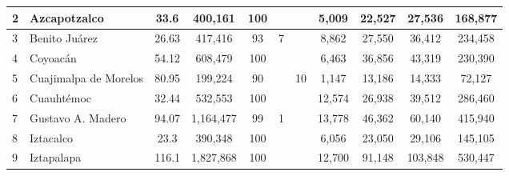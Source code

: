 \begin{landscape}
\begin{table}[]
{\begin{tabular}{llcccllcccc}
\multicolumn{1}{|l|}{2} & \multicolumn{1}{l|}{Azcapotzalco} & \multicolumn{1}{c|}{33.6} & \multicolumn{1}{c|}{400,161} & \multicolumn{1}{c|}{100} & \multicolumn{1}{l|}{} & \multicolumn{1}{c|}{} & \multicolumn{1}{c|}{5,009} & \multicolumn{1}{c|}{22,527} & \multicolumn{1}{c|}{27,536} & \multicolumn{1}{c|}{168,877} \\ \hline
\multicolumn{1}{|l|}{3} & \multicolumn{1}{l|}{Benito Juárez} & \multicolumn{1}{c|}{26.63} & \multicolumn{1}{c|}{417,416} & \multicolumn{1}{c|}{93} & \multicolumn{1}{c|}{7} & \multicolumn{1}{l|}{} & \multicolumn{1}{c|}{8,862} & \multicolumn{1}{c|}{27,550} & \multicolumn{1}{c|}{36,412} & \multicolumn{1}{c|}{234,458} \\ \hline
\multicolumn{1}{|l|}{4} & \multicolumn{1}{l|}{Coyoacán} & \multicolumn{1}{c|}{54.12} & \multicolumn{1}{c|}{608,479} & \multicolumn{1}{c|}{100} & \multicolumn{1}{l|}{} & \multicolumn{1}{l|}{} & \multicolumn{1}{c|}{6,463} & \multicolumn{1}{c|}{36,856} & \multicolumn{1}{c|}{43,319} & \multicolumn{1}{c|}{230,390} \\ \hline
\multicolumn{1}{|l|}{5} & \multicolumn{1}{l|}{Cuajimalpa de Morelos} & \multicolumn{1}{c|}{80.95} & \multicolumn{1}{c|}{199,224} & \multicolumn{1}{c|}{90} & \multicolumn{1}{l|}{} & \multicolumn{1}{c|}{10} & \multicolumn{1}{c|}{1,147} & \multicolumn{1}{c|}{13,186} & \multicolumn{1}{c|}{14,333} & \multicolumn{1}{c|}{72,127} \\ \hline
\multicolumn{1}{|l|}{6} & \multicolumn{1}{l|}{Cuauhtémoc} & \multicolumn{1}{c|}{32.44} & \multicolumn{1}{c|}{532,553} & \multicolumn{1}{c|}{100} & \multicolumn{1}{l|}{} & \multicolumn{1}{l|}{} & \multicolumn{1}{c|}{12,574} & \multicolumn{1}{c|}{26,938} & \multicolumn{1}{c|}{39,512} & \multicolumn{1}{c|}{286,460} \\ \hline
\multicolumn{1}{|l|}{7} & \multicolumn{1}{l|}{Gustavo A. Madero} & \multicolumn{1}{c|}{94.07} & \multicolumn{1}{c|}{1,164,477} & \multicolumn{1}{c|}{99} & \multicolumn{1}{c|}{1} & \multicolumn{1}{l|}{} & \multicolumn{1}{c|}{13,778} & \multicolumn{1}{c|}{46,362} & \multicolumn{1}{c|}{60,140} & \multicolumn{1}{c|}{415,940} \\ \hline
\multicolumn{1}{|l|}{8} & \multicolumn{1}{l|}{Iztacalco} & \multicolumn{1}{c|}{23.3} & \multicolumn{1}{c|}{390,348} & \multicolumn{1}{c|}{100} & \multicolumn{1}{l|}{} & \multicolumn{1}{l|}{} & \multicolumn{1}{c|}{6,056} & \multicolumn{1}{c|}{23,050} & \multicolumn{1}{c|}{29,106} & \multicolumn{1}{c|}{145,105} \\ \hline
\multicolumn{1}{|l|}{9} & \multicolumn{1}{l|}{Iztapalapa} & \multicolumn{1}{c|}{116.1} & \multicolumn{1}{c|}{1,827,868} & \multicolumn{1}{c|}{100} & \multicolumn{1}{l|}{} & \multicolumn{1}{l|}{} & \multicolumn{1}{c|}{12,700} & \multicolumn{1}{c|}{91,148} & \multicolumn{1}{c|}{103,848} & \multicolumn{1}{c|}{530,447} \\ \hline

\end{tabular}}
\end{table}
\end{landscape}
